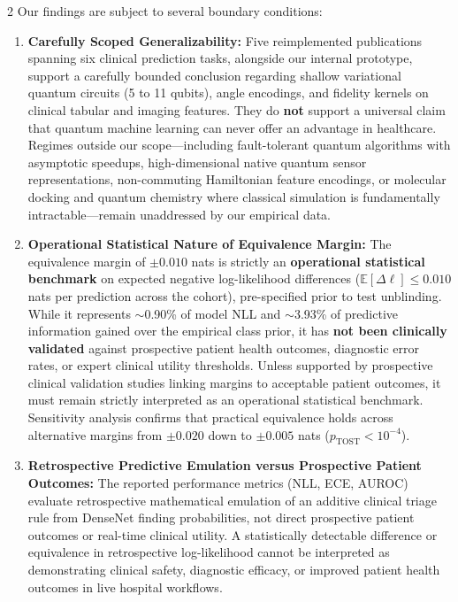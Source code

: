 \documentclass[10pt,a4paper,twoside]{article}
\begin{document}
\begin{multicols}{2}
Our findings are subject to several boundary conditions:
\begin{enumerate}
  \setlength{\itemsep}{1pt}
  \setlength{\parskip}{0pt}
  \item \textbf{Carefully Scoped Generalizability:} Five reimplemented publications spanning six clinical prediction tasks, alongside our internal prototype, support a carefully bounded conclusion regarding shallow variational quantum circuits (5 to 11 qubits), angle encodings, and fidelity kernels on clinical tabular and imaging features. They do \textbf{not} support a universal claim that quantum machine learning can never offer an advantage in healthcare. Regimes outside our scope---including fault-tolerant quantum algorithms with asymptotic speedups, high-dimensional native quantum sensor representations, non-commuting Hamiltonian feature encodings, or molecular docking and quantum chemistry where classical simulation is fundamentally intractable---remain unaddressed by our empirical data.
  \item \textbf{Operational Statistical Nature of Equivalence Margin:} The equivalence margin of $\pm 0.010$ nats is strictly an \textbf{operational statistical benchmark} on expected negative log-likelihood differences ($\mathbb{E}[\Delta\ell] \le 0.010$ nats per prediction across the cohort), pre-specified prior to test unblinding. While it represents $\sim$0.90\% of model NLL and $\sim$3.93\% of predictive information gained over the empirical class prior, it has \textbf{not been clinically validated} against prospective patient health outcomes, diagnostic error rates, or expert clinical utility thresholds. Unless supported by prospective clinical validation studies linking margins to acceptable patient outcomes, it must remain strictly interpreted as an operational statistical benchmark. Sensitivity analysis confirms that practical equivalence holds across alternative margins from $\pm 0.020$ down to $\pm 0.005$ nats ($p_{\text{TOST}} < 10^{-4}$).
  \item \textbf{Retrospective Predictive Emulation versus Prospective Patient Outcomes:} The reported performance metrics (NLL, ECE, AUROC) evaluate retrospective mathematical emulation of an additive clinical triage rule from DenseNet finding probabilities, not direct prospective patient outcomes or real-time clinical utility. A statistically detectable difference or equivalence in retrospective log-likelihood cannot be interpreted as demonstrating clinical safety, diagnostic efficacy, or improved patient health outcomes in live hospital workflows.

\end{enumerate}
\end{multicols}
\end{document}
